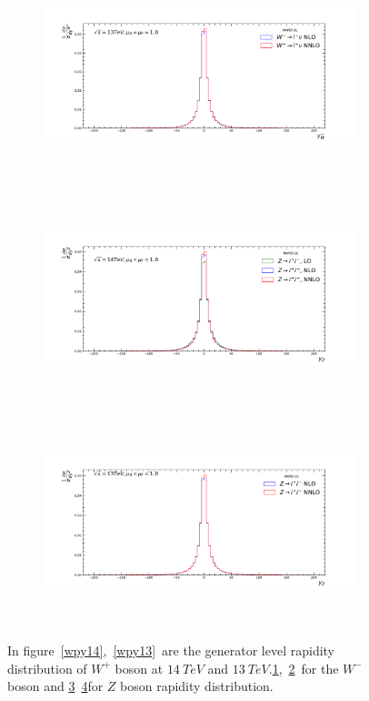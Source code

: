 \begin{figure}[H]
\begin{subfigure}{0.49\textwidth}
\label{wmy14}
\end{subfigure}
\begin{subfigure}{0.49\textwidth}
\includegraphics[height=6cm, width=\textwidth]{chapter4/WmY13.pdf}
\vspace*{-8mm}
\caption{}
\label{wmy13}
\end{subfigure}
\begin{subfigure}{0.49\textwidth}
\includegraphics[height=6cm, width=\textwidth]{chapter4/ZY14.pdf}
\vspace*{-8mm}
\caption{}
\label{zy14}
\end{subfigure}
\begin{subfigure}{0.49\textwidth}
\includegraphics[height=6cm, width=\textwidth]{chapter4/ZY13.pdf}
\vspace*{-8mm}
\caption{}
\label{zy13}
\end{subfigure}
\caption{In figure~\ref{wpy14},~\ref{wpy13}~are the generator level rapidity distribution of $W^{+}$ boson at $14~TeV$ and $13~TeV$.\ref{wmy14},~\ref{wmy13}~for the  $W^{-}$ boson and \ref{zy14}~\ref{zy13}for $Z$ boson rapidity distribution.}  
\label{dist4}
\end{figure}


